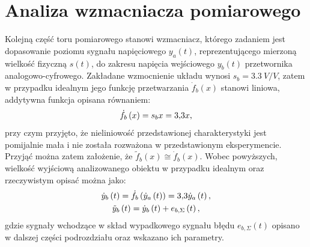 \section{Analiza wzmacniacza pomiarowego}

Kolejną część toru pomiarowego stanowi wzmacniacz, którego zadaniem jest dopasowanie poziomu sygnału napięciowego $y_{a}(t)$, reprezentującego mierzoną wielkość fizyczną $s(t)$, do zakresu napięcia wejściowego $y_{b}(t)$ przetwornika analogowo-cyfrowego. Zakładane wzmocnienie układu wynosi $s_{b} = \qty{3.3}{V \per V}$, zatem w przypadku idealnym jego funkcję przetwarzania $\dot{f}_{b}(x)$ stanowi liniowa, addytywna funkcja opisana równaniem:
\begin{equation}
\dot{f}_{b} \left(x\right) = s_{b} x = \num{3.3} x \label{eq:sym_partb_function},
\end{equation}
przy czym przyjęto, że nieliniowość przedstawionej charakterystyki jest pomijalnie mała i nie została rozważona w przedstawionym eksperymencie. Przyjąć można zatem założenie, że $\tilde{f}_{b}(x) \cong \dot{f}_{b}(x)$. Wobec powyższych, wielkość wyjściową analizowanego obiektu w przypadku idealnym oraz rzeczywistym opisać można jako:
\begin{gather}
\dot{y}_{b} \left(t\right) = \dot{f}_{b} \left(\dot{y}_{a} \left(t\right)\right) = \num{3.3} \dot{y}_{a} \left(t\right) \label{eq:sym_partb_out_ideal}, \\
\tilde{y}_{b} \left(t\right) = \dot{y}_{b} \left(t\right) + e_{b,\Sigma} \left(t\right) \label{eq:sym_partb_out_real},
\end{gather}
gdzie sygnały wchodzące w skład wypadkowego sygnału błędu $e_{b,\Sigma}(t)$ opisano w dalszej części podrozdziału oraz wskazano ich parametry.

